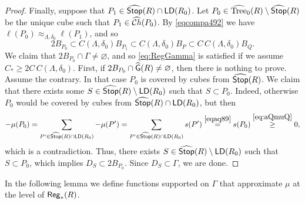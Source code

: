 \begin{proof}
	Finally, suppose that $P_1\in{\widehat{{\mathsf {Stop}}}}(R)\cap{\mathsf{LD}}(R_0)$. Let $P_0\in{\widehat{{\rm Tree}}}_0(R)\setminus{\widehat{{\mathsf {Stop}}}}(R)$ be the unique cube such that $P_1\in{\widehat{{\mathcal Ch}}}(P_0)$. By \eqref{eqcompa492} we have $\ell(P_0)\approx_{\Lambda,\delta_0}\ell(P_1)$, and so
	\begin{equation*}
	2B_{P_0}\subset C(\Lambda,\delta_0) B_{P_1}\subset C(\Lambda,\delta_0) B_{P}\subset C\, C(\Lambda,\delta_0) B_{Q}.
	\end{equation*}
	We claim that $2B_{P_0}\cap\Gamma\neq\varnothing$, and so \eqref{eq:RegGamma} is satisfied if we assume $C_*\ge 2C\, C(\Lambda,\delta_0)$. First, if $2B_{P_0}\cap{\widehat{{\mathsf G}}}(R)\neq\varnothing$, then there is nothing to prove. Assume the contrary. In that case $P_0$ is covered by cubes from ${\widehat{{\mathsf{Stop}}}}(R)$. We claim that there exists some $S\in{\widehat{{\mathsf {Stop}}}}(R)\setminus{\mathsf{LD}}(R_0)$ such that $S\subset P_0$. Indeed, otherwise $P_0$ would be covered by cubes from ${\widehat{{\mathsf {Stop}}}}(R)\cap{\mathsf{LD}}(R_0)$, but then
	\begin{equation*}
	-\mu(P_0)=\sum_{P'\in{\widehat{{\mathsf {Stop}}}}(R)\cap{\mathsf{LD}}(R_0)}-\mu(P')=\sum_{P'\in{\widehat{{\mathsf {Stop}}}}(R)\cap{\mathsf{LD}}(R_0)}s(P') \overset{\eqref{eqaq89}}{=}s(P_0)\overset{\eqref{eq:aQmuQ}}{\ge}0,
	\end{equation*}
	which is a contradiction. Thus, there exists $S\in{\widehat{{\mathsf {Stop}}}}(R)\setminus{\mathsf{LD}}(R_0)$ such that $S\subset P_0$, which implies $D_{S}\subset 2B_{P_0}$. Since $D_{S}\subset\Gamma$, we are done.
\end{proof}

In the following lemma we define functions supported on $\Gamma$ that approximate $\mu$ at the level of ${\mathsf{Reg}}_*(R)$.

